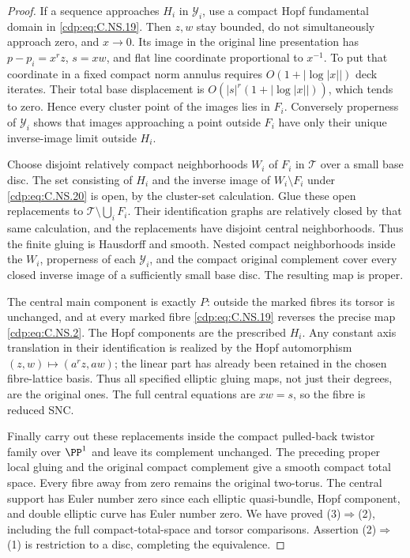 \begin{proof}
If a sequence approaches $H_i$ in
$\mathcal Y_i$, use a compact Hopf
fundamental domain in \eqref{cdp:eq:C.NS.19}.
Then $z,w$ stay bounded, do not
simultaneously approach zero, and
$x\to0$. Its image in the original
line presentation has
$p-p_i=x^rz$, $s=xw$, and flat
line coordinate proportional to $x^{-1}$.
To put that coordinate in a fixed
compact norm annulus requires
$O(1+|\log|x||)$ deck iterates.
Their total base displacement is
$O(|s|^r(1+|\log|x||))$, which
tends to zero. Hence every cluster
point of the images lies in $F_i$.
Conversely properness of $\mathcal Y_i$
shows that images approaching a point
outside $F_i$ have only their unique
inverse-image limit outside $H_i$.

Choose disjoint relatively compact
neighborhoods $W_i$ of $F_i$ in
$\mathcal T$ over a small base disc.
The set consisting of $H_i$ and the
inverse image of $W_i\setminus F_i$
under \eqref{cdp:eq:C.NS.20} is open, by the
cluster-set calculation. Glue these
open replacements to
$\mathcal T\setminus\bigcup_i F_i$.
Their identification graphs are
relatively closed by that same
calculation, and the replacements
have disjoint central neighborhoods.
Thus the finite gluing is Hausdorff
and smooth. Nested compact
neighborhoods inside the $W_i$,
properness of each $\mathcal Y_i$,
and the compact original complement
cover every closed inverse image
of a sufficiently small base disc.
The resulting map is proper.

The central main component is exactly
$P$: outside the marked fibres its
torsor is unchanged, and at every
marked fibre \eqref{cdp:eq:C.NS.19} reverses
the precise map \eqref{cdp:eq:C.NS.2}.
The Hopf components are the prescribed
$H_i$. Any constant axis translation
in their identification is realized
by the Hopf automorphism
$(z,w)\mapsto(a^rz,aw)$; the linear
part has already been retained in
the chosen fibre-lattice basis.
Thus all specified elliptic gluing
maps, not just their degrees, are
the original ones. The full central
equations are $xw=s$, so the fibre
is reduced SNC.

Finally carry out these replacements
inside the compact pulled-back
twistor family over $\PP^1$ and
leave its complement unchanged.
The preceding proper local gluing
and the original compact complement
give a smooth compact total space.
Every fibre away from zero remains
the original two-torus. The central
support has Euler number zero since
each elliptic quasi-bundle, Hopf
component, and double elliptic curve
has Euler number zero. We have
proved (3)$\Rightarrow$(2), including
the full compact-total-space and
torsor comparisons. Assertion
(2)$\Rightarrow$(1) is restriction
to a disc, completing the equivalence.
\end{proof}


